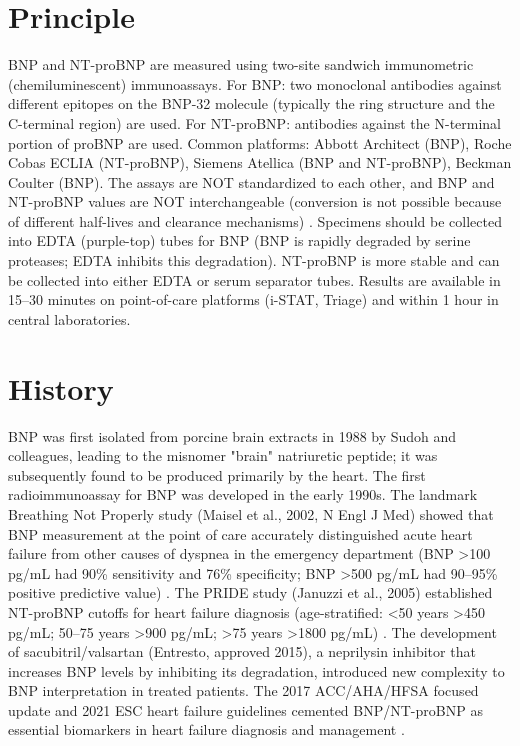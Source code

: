 \section*{Principle}
BNP and NT-proBNP are measured using two-site sandwich immunometric (chemiluminescent) immunoassays. For BNP: two monoclonal antibodies against different epitopes on the BNP-32 molecule (typically the ring structure and the C-terminal region) are used. For NT-proBNP: antibodies against the N-terminal portion of proBNP are used. Common platforms: Abbott Architect (BNP), Roche Cobas ECLIA (NT-proBNP), Siemens Atellica (BNP and NT-proBNP), Beckman Coulter (BNP). The assays are NOT standardized to each other, and BNP and NT-proBNP values are NOT interchangeable (conversion is not possible because of different half-lives and clearance mechanisms) \cite{tietz2012textbook}. Specimens should be collected into EDTA (purple-top) tubes for BNP (BNP is rapidly degraded by serine proteases; EDTA inhibits this degradation). NT-proBNP is more stable and can be collected into either EDTA or serum separator tubes. Results are available in 15--30 minutes on point-of-care platforms (i-STAT, Triage) and within 1 hour in central laboratories.

\section*{History}
BNP was first isolated from porcine brain extracts in 1988 by Sudoh and colleagues, leading to the misnomer "brain" natriuretic peptide; it was subsequently found to be produced primarily by the heart. The first radioimmunoassay for BNP was developed in the early 1990s. The landmark Breathing Not Properly study (Maisel et al., 2002, N Engl J Med) showed that BNP measurement at the point of care accurately distinguished acute heart failure from other causes of dyspnea in the emergency department (BNP >100 pg/mL had 90\% sensitivity and 76\% specificity; BNP >500 pg/mL had 90--95\% positive predictive value) \cite{maisel2002rapid}. The PRIDE study (Januzzi et al., 2005) established NT-proBNP cutoffs for heart failure diagnosis (age-stratified: <50 years >450 pg/mL; 50--75 years >900 pg/mL; >75 years >1800 pg/mL) \cite{januzzi2005nterminal}. The development of sacubitril/valsartan (Entresto, approved 2015), a neprilysin inhibitor that increases BNP levels by inhibiting its degradation, introduced new complexity to BNP interpretation in treated patients. The 2017 ACC/AHA/HFSA focused update and 2021 ESC heart failure guidelines cemented BNP/NT-proBNP as essential biomarkers in heart failure diagnosis and management \cite{mcdonagh2021esc}.

